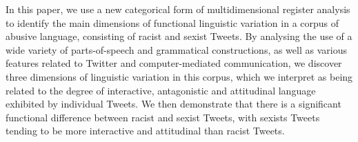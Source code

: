 In this paper, we use a new categorical form of multidimensional register analysis to identify the main dimensions of functional linguistic variation in a corpus of abusive language, consisting of racist and sexist Tweets. By analysing the use of a wide variety of parts-of-speech and grammatical constructions, as well as various features related to Twitter and computer-mediated communication, we discover three dimensions of linguistic variation in this corpus, which we interpret as being related to the degree of interactive, antagonistic and attitudinal language exhibited by individual Tweets. We then demonstrate that there is a significant functional difference between racist and sexist Tweets, with sexists Tweets tending to be more interactive and attitudinal than racist Tweets.
